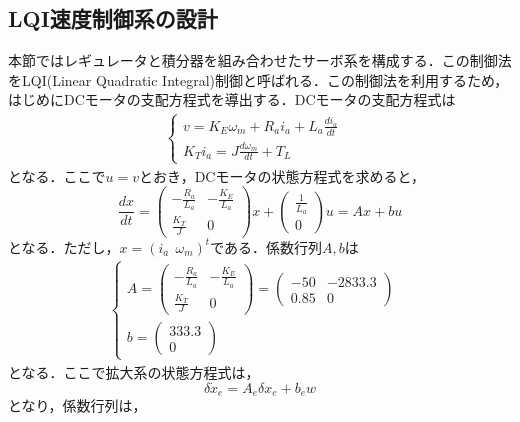 \documentclass[a4paper,12pt]{jarticle}
\begin{document}
\subsection{LQI速度制御系の設計}
本節ではレギュレータと積分器を組み合わせたサーボ系を構成する．この制御法
をLQI(Linear Quadratic Integral)制御と呼ばれる．この制御法を利用するため，
はじめにDCモータの支配方程式を導出する．DCモータの支配方程式は
%
\begin{eqnarray}
 \begin{cases}
  v = K_{E}\omega_m + R_{a}i_{a} + L_{a} \frac{di_a}{dt} & \\
  K_{T}i_a = J \frac{d\omega_m}{dt} + T_{L}
 \end{cases}
\end{eqnarray}
%
となる．ここで$u=v$とおき，DCモータの状態方程式を求めると，
\begin{equation}
 \frac{dx}{dt} =
  \begin{pmatrix}
   - \frac{R_a}{L_a} & -\frac{K_E}{L_a} \\
   \frac{K_T}{J} & 0
  \end{pmatrix}
  x +
\begin{pmatrix}
 \frac{1}{L_a} \\
 0
\end{pmatrix}
u = Ax + bu
\end{equation}
となる．ただし，$x=(i_a \ \ \omega_m)^t$である．係数行列$A,b$は
%
\begin{eqnarray}
 \begin{cases}
A=
  \begin{pmatrix}
   - \frac{R_a}{L_a} & -\frac{K_E}{L_a} \\
   \frac{K_T}{J} & 0
  \end{pmatrix}
  =
  \begin{pmatrix}
   -50  & -2833.3 \\
   0.85 & 0
  \end{pmatrix}
  & \\
  b =
  \begin{pmatrix}
   333.3 \\
   0
  \end{pmatrix}
 \end{cases}
\end{eqnarray}
%
となる．ここで拡大系の状態方程式は，
%
\begin{equation}
 \delta \dot{x}_e = A_{e}\delta x_e + b_e w
\end{equation}
%
となり，係数行列は，
%
\end{document}
